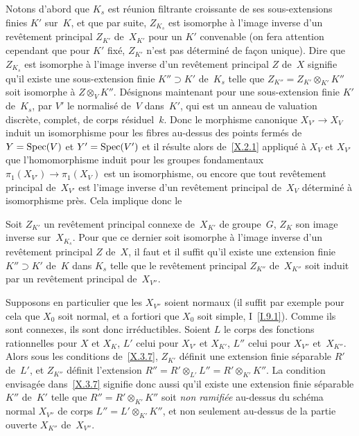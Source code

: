 Notons d'abord que $K_s$ est r\'eunion filtrante croissante de ses
sous-extensions finies $K'$ sur~$K$, et que par suite, $Z_{K_s}$
est isomorphe \`a l'image inverse d'un rev\^etement principal
$Z_{K'}$ de~$X_{K'}$ pour un $K'$ convenable (on fera attention
cependant que pour $K'$ fix\'e, $Z_{K'}$ n'est pas d\'etermin\'e
de fa\c con unique). Dire que $Z_{K_s}$ est isomorphe \`a l'image
inverse d'un rev\^etement principal $Z$ de~$X$ signifie qu'il existe
une sous-extension finie $K''\supset K'$ de~$K_s$ telle que
$Z_{K''}=Z_{K'}\otimes_{K'} K''$ soit isomorphe \`a $Z\otimes_V
K''$. D\'esignons maintenant pour une sous-extension finie $K'$
de~$K_s$, par $V'$ le normalis\'e de~$V$ dans~$K'$, qui est un
anneau de valuation discr\`ete, complet, de corps
r\'esiduel~$k$. Donc le morphisme canonique $X_{V'}\to X_V$ induit
un isomorphisme pour les fibres au-dessus des points ferm\'es de
$Y=\operatorname{Spec}(V)$ et $Y'=\operatorname{Spec}(V')$ et il r\'esulte alors de~\ref{X.2.1}
appliqu\'e \`a $X_V$ et $X_{V'}$ que l'homomorphisme induit pour
les groupes fondamentaux $\pi_1(X_{V'})\to \pi_1(X_V)$ est un
isomorphisme, ou encore que tout rev\^etement principal de~$X_{V'}$
est l'image inverse d'un rev\^etement principal de~$X_V$
d\'etermin\'e \`a isomorphisme pr\`es. Cela implique donc le

\begin{lemme}
\label{X.3.7}
Soit $Z_{K'}$ un rev\^etement principal connexe de~$X_{K'}$ de
groupe~$G$, $Z_{K}$ son image inverse sur~$X_{K_s}$\quoi. Pour que ce
dernier soit isomorphe \`a l'image inverse d'un rev\^etement
principal $Z$ de~$X$, il faut et il suffit qu'il existe une extension
finie $K''\supset K'$ de~$K$ dans $K_s$ telle que le rev\^etement
principal $Z_{K''}$ de~$X_{K''}$ soit induit par un rev\^etement
principal de~$X_{V''}$.
\end{lemme}

Supposons en particulier que les $X_{V''}$ soient normaux (il suffit
par exemple pour cela que $X_0$ soit normal, et a fortiori que $X_0$
soit simple, \cf I~\ref{I.9.1}).
Comme ils sont connexes, ils sont donc irr\'eductibles. Soient $L$ le
corps des fonctions rationnelles pour $X$ et $X_{K}$, $L'$ celui pour
$X_{V'}$ et $X_{K'}$, $L''$ celui pour $X_{V''}$ et~$X_{K''}$\quoi. Alors
sous les conditions de~\ref{X.3.7}, $Z_{K'}$ d\'efinit une extension
finie s\'eparable $R'$ de~$L'$, et $Z_{K''}$ d\'efinit l'extension
$R''=R'\otimes_{L'} L'' = R'\otimes_{K'} K''$. La condition
envisag\'ee dans~\ref{X.3.7} signifie donc aussi qu'il existe une
extension finie s\'eparable $K''$ de~$K'$ telle que
$R''=R'\otimes_{K'} K''$ soit \emph{non ramifiée} au-dessus du
sch\'ema normal $X_{V''}$ de corps $L''=L'\otimes_{K'} K''$, et non
seulement au-dessus de la partie ouverte $X_{K''}$ de~$X_{V''}$.

